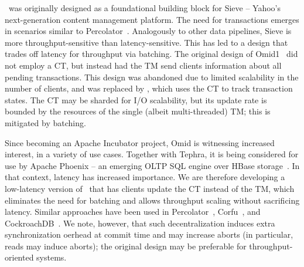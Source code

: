 
\sys\ was originally designed as a foundational building block for Sieve -- Yahoo's next-generation content 
management platform. 
The need for transactions emerges in scenarios similar to Percolator~\cite{Percolator2010}.  
Analogously to other data pipelines, Sieve is more throughput-sensitive than latency-sensitive. This has led 
to a design that trades off latency for throughput via batching.
The original design of Omid1~\cite{OmidICDE2014} did not employ a CT, but instead had the TM send clients information
about all pending transactions. This design was abandoned due to limited scalability in the number of clients,
 and was replaced by \sys, which uses the CT to track transaction states. The CT may be sharded for I/O scalability, 
but its update rate is bounded by the resources of the single (albeit multi-threaded) TM; this is mitigated by batching.

Since becoming an Apache Incubator project, Omid is witnessing increased interest, in a variety of use cases. 
Together with Tephra, it is being considered for use by Apache Phoenix -- an emerging OLTP SQL engine over HBase 
storage~\cite{phoenix}. In that context, latency has increased importance. We are therefore developing a low-latency 
version of \sys\, that has clients update the CT instead of the TM, which eliminates the need for batching and allows 
throughput scaling without sacrificing latency. Similar approaches have been used in Percolator~\cite{Percolator2010}, 
Corfu~\cite{BalakrishnanMDPWW13}, and CockroachDB~\cite{cockroach}. We note, however, that such decentralization 
induces extra synchronization oerhead at commit time and  may increase aborts (in particular, reads may induce aborts); 
the original design may be preferable for throughput-oriented systems.


